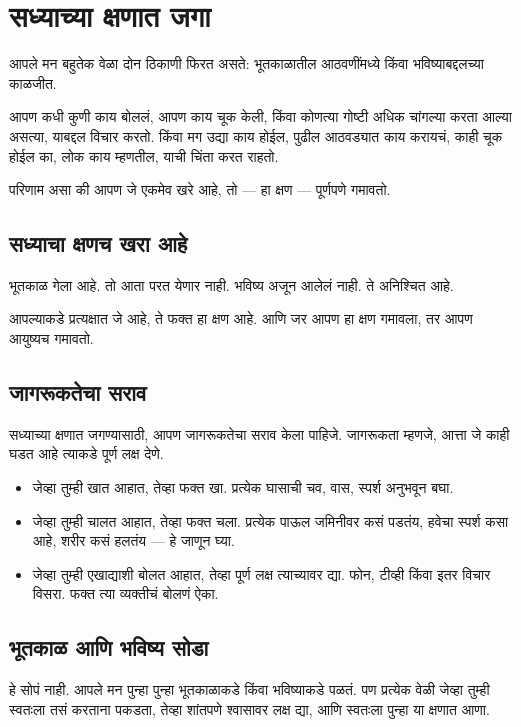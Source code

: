 \chapter{सध्याच्या क्षणात जगा}

आपले मन बहुतेक वेळा दोन ठिकाणी फिरत असते: 
भूतकाळातील आठवणींमध्ये किंवा भविष्याबद्दलच्या काळजीत. 

आपण कधी कुणी काय बोललं, आपण काय चूक केली, 
किंवा कोणत्या गोष्टी अधिक चांगल्या करता आल्या असत्या, 
याबद्दल विचार करतो. 
किंवा मग उद्या काय होईल, पुढील आठवड्यात काय करायचं, 
काही चूक होईल का, लोक काय म्हणतील, 
याची चिंता करत राहतो. 

परिणाम असा की आपण जे एकमेव खरे आहे, 
तो — हा क्षण — पूर्णपणे गमावतो. 

\section*{सध्याचा क्षणच खरा आहे}
भूतकाळ गेला आहे. 
तो आता परत येणार नाही. 
भविष्य अजून आलेलं नाही. 
ते अनिश्चित आहे. 

आपल्याकडे प्रत्यक्षात जे आहे, ते फक्त हा क्षण आहे. 
आणि जर आपण हा क्षण गमावला, तर आपण आयुष्यच गमावतो. 

\section*{जागरूकतेचा सराव}
सध्याच्या क्षणात जगण्यासाठी, 
आपण जागरूकतेचा सराव केला पाहिजे. 
जागरूकता म्हणजे, 
आत्ता जे काही घडत आहे त्याकडे पूर्ण लक्ष देणे. 

\begin{itemize}
\item जेव्हा तुम्ही खात आहात, तेव्हा फक्त खा. 
प्रत्येक घासाची चव, वास, स्पर्श अनुभवून बघा. 
\item जेव्हा तुम्ही चालत आहात, तेव्हा फक्त चला. 
प्रत्येक पाऊल जमिनीवर कसं पडतंय, 
हवेचा स्पर्श कसा आहे, 
शरीर कसं हलतंय — हे जाणून घ्या. 
\item जेव्हा तुम्ही एखाद्याशी बोलत आहात, 
तेव्हा पूर्ण लक्ष त्याच्यावर द्या. 
फोन, टीव्ही किंवा इतर विचार विसरा. 
फक्त त्या व्यक्तीचं बोलणं ऐका. 
\end{itemize}

\section*{भूतकाळ आणि भविष्य सोडा}
हे सोपं नाही. 
आपले मन पुन्हा पुन्हा भूतकाळाकडे किंवा भविष्याकडे पळतं. 
पण प्रत्येक वेळी जेव्हा तुम्ही स्वतःला तसं करताना पकडता, 
तेव्हा शांतपणे श्वासावर लक्ष द्या, 
आणि स्वतःला पुन्हा या क्षणात आणा. 

